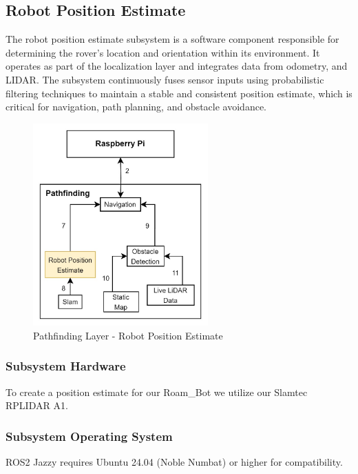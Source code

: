 \newpage
\subsection{Robot Position Estimate}
The robot position estimate subsystem is a software component responsible for determining the rover's location and orientation within its environment. It operates as part of the localization layer and integrates data from odometry, and LIDAR. The subsystem continuously fuses sensor inputs using probabilistic filtering techniques to maintain a stable and consistent position estimate, which is critical for navigation, path planning, and obstacle avoidance.

\begin{figure}[h!]
 	\centering
  	\includegraphics[width=0.60\textwidth]{images/pathfinding/robotpositionestimate.jpg}
  \caption{Pathfinding Layer - Robot Position Estimate}
 \end{figure}

 \subsubsection{Subsystem Hardware}
To create a position estimate for our Roam\_Bot we utilize our Slamtec RPLIDAR A1. 

\subsubsection{Subsystem Operating System}
ROS2 Jazzy requires Ubuntu 24.04 (Noble Numbat) or higher for compatibility.


